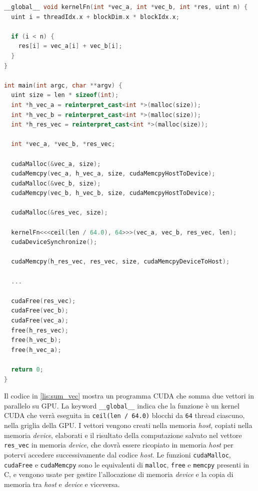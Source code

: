 \newpage
\vspace{5mm}
\begin{lstlisting}[language=C++, caption=Somma di vettori in CUDA, label=lis:sum_vec]
__global__ void kernelFn(int *vec_a, int *vec_b, int *res, uint n) {
  uint i = threadIdx.x + blockDim.x * blockIdx.x;

  if (i < n) {
    res[i] = vec_a[i] + vec_b[i];
  }
}

int main(int argc, char **argv) {
  uint size = len * sizeof(int);
  int *h_vec_a = reinterpret_cast<int *>(malloc(size));
  int *h_vec_b = reinterpret_cast<int *>(malloc(size));
  int *h_res_vec = reinterpret_cast<int *>(malloc(size));

  int *vec_a, *vec_b, *res_vec;

  cudaMalloc(&vec_a, size);
  cudaMemcpy(vec_a, h_vec_a, size, cudaMemcpyHostToDevice);
  cudaMalloc(&vec_b, size);
  cudaMemcpy(vec_b, h_vec_b, size, cudaMemcpyHostToDevice);

  cudaMalloc(&res_vec, size);

  kernelFn<<<ceil(len / 64.0), 64>>>(vec_a, vec_b, res_vec, len);
  cudaDeviceSynchronize();

  cudaMemcpy(h_res_vec, res_vec, size, cudaMemcpyDeviceToHost);

  ...

  cudaFree(res_vec);
  cudaFree(vec_b);
  cudaFree(vec_a);
  free(h_res_vec);
  free(h_vec_b);
  free(h_vec_a);

  return 0;
}
\end{lstlisting}
\vspace{5mm}

Il codice in \ref{lis:sum_vec} mostra un programma \gls{CUDA} che somma due vettori in parallelo su \gls{GPU}. La keyword \verb|__global__| indica che la funzione è un kernel \gls{CUDA} che verrà eseguita in \verb|ceil(len / 64.0)| blocchi da \verb|64| thread ciascuno, nella griglia della \gls{GPU}. I vettori vengono creati nella memoria \textit{host}, copiati nella memoria \textit{device}, elaborati e il risultato della computazione salvato nel vettore \verb|res_vec| in memoria \textit{device}, che dovrà essere ricopiato in memoria \textit{host} per potervi accedere successivamente dal codice \textit{host}. Le funzioni \verb|cudaMalloc|, \verb|cudaFree| e \verb|cudaMemcpy| sono le equivalenti di \verb|malloc|, \verb|free| e \verb|memcpy| presenti in C, e vengono usate per gestire l'allocazione di memoria \textit{device} e la copia di memoria tra \textit{host} e \textit{device} e viceversa.

